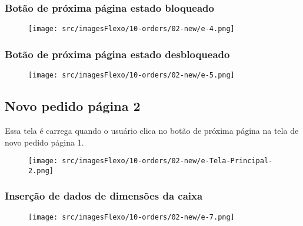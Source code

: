 \newpage
\thispagestyle{fancy}
\vspace*{40 pt}
\subsubsection{\small{Botão de próxima página estado bloqueado}}
\vspace*{\fill}
\begin{figure}[h]
  \centering
  \texttt{[image: src/imagesFlexo/10-orders/02-new/e-4.png]}
\end{figure}
\vspace*{\fill}

\newpage
\thispagestyle{fancy}
\vspace*{40 pt}
\subsubsection{\small{Botão de próxima página estado desbloqueado}}
\vspace*{\fill}
\begin{figure}[h]
  \centering
  \texttt{[image: src/imagesFlexo/10-orders/02-new/e-5.png]}
\end{figure}
\vspace*{\fill}

\newpage
\thispagestyle{fancy}
\vspace*{40 pt}
\subsection{Novo pedido página 2}
Essa tela é carrega quando o usuário clica no botão de próxima página na tela de novo pedido página 1.
\vspace*{\fill}
\begin{figure}[h]
  \centering
  \texttt{[image: src/imagesFlexo/10-orders/02-new/e-Tela-Principal-2.png]}
\end{figure}

\newpage
\thispagestyle{fancy}
\vspace*{40 pt}
\subsubsection{\small{Inserção de dados de dimensões da caixa}}
\vspace*{\fill}
\begin{figure}[h]
  \centering
  \texttt{[image: src/imagesFlexo/10-orders/02-new/e-7.png]}
\end{figure}
\vspace*{\fill}

